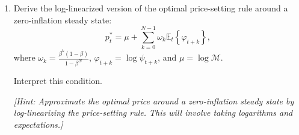 \documentclass[dvipsnames,11pt]{article}
\begin{document}
\begin{enumerate}
\begin{solution}
                
            \end{solution}
    
        \item Derive the log-linearized version of the optimal price-setting rule around a zero-inflation steady state:
        \[
        p_t^* = \mu + \sum_{k=0}^{N-1} \omega_k \mathbb{E}_t \left\{ \varphi_{t+k} \right\},
        \]
        where \( \omega_k = \frac{\beta^k (1 - \beta)}{1 - \beta^N} \), \( \varphi_{t+k} = \log \psi_{t+k} \), and \( \mu = \log \mathcal{M} \).
    
        Interpret this condition.
    
        \textit{[Hint: Approximate the optimal price around a zero-inflation steady state by log-linearizing the price-setting rule. This will involve taking logarithms and expectations.]}
    

\end{enumerate}
\end{document}
